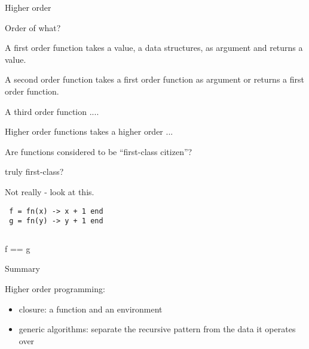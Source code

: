 \begin{frame}{Higher order}

Order of what?

\pause\vspace{20pt}
A first order function takes a value, a data structures, as argument and returns a value.

\pause\vspace{20pt}
A second order function takes a first order function as argument or returns a first order function.

\pause\vspace{20pt}
A third order function ....

\pause\vspace{20pt}
Higher order functions takes a higher order ...

\pause\vspace{20pt}
Are functions considered to be ``first-class citizen''?
\end{frame}

\begin{frame}[fragile]{truly first-class?}
    
  \vspace{20pt}Not really - look at this.
    
\begin{verbatim}
 f = fn(x) -> x + 1 end
 g = fn(y) -> y + 1 end
\end{verbatim}
\vspace{20pt}\pause
\begin{verbatim}
\end{verbatim}
  f == g 
\end{frame}

\begin{frame}{Summary}

\pause Higher order programming:

\begin{itemize}
\pause\item {closure}: a function and an environment
\pause\item {generic algorithms}: separate the recursive pattern from the data it operates over
\end{itemize}


\end{frame}






